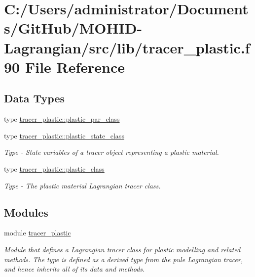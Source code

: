 \hypertarget{tracer__plastic_8f90}{}\section{C\+:/\+Users/administrator/\+Documents/\+Git\+Hub/\+M\+O\+H\+I\+D-\/\+Lagrangian/src/lib/tracer\+\_\+plastic.f90 File Reference}
\label{tracer__plastic_8f90}
\subsection*{Data Types}
\begin{DoxyCompactItemize}
\item 
type \hyperlink{structtracer__plastic_1_1plastic__par__class}{tracer\+\_\+plastic\+::plastic\+\_\+par\+\_\+class}
\item 
type \hyperlink{structtracer__plastic_1_1plastic__state__class}{tracer\+\_\+plastic\+::plastic\+\_\+state\+\_\+class}
\begin{DoxyCompactList}\small\item\em Type -\/ State variables of a tracer object representing a plastic material. \end{DoxyCompactList}\item 
type \hyperlink{structtracer__plastic_1_1plastic__class}{tracer\+\_\+plastic\+::plastic\+\_\+class}
\begin{DoxyCompactList}\small\item\em Type -\/ The plastic material Lagrangian tracer class. \end{DoxyCompactList}\end{DoxyCompactItemize}
\subsection*{Modules}
\begin{DoxyCompactItemize}
\item 
module \hyperlink{namespacetracer__plastic}{tracer\+\_\+plastic}
\begin{DoxyCompactList}\small\item\em Module that defines a Lagrangian tracer class for plastic modelling and related methods. The type is defined as a derived type from the pule Lagrangian tracer, and hence inherits all of it\textquotesingle{}s data and methods. \end{DoxyCompactList}\end{DoxyCompactItemize}
